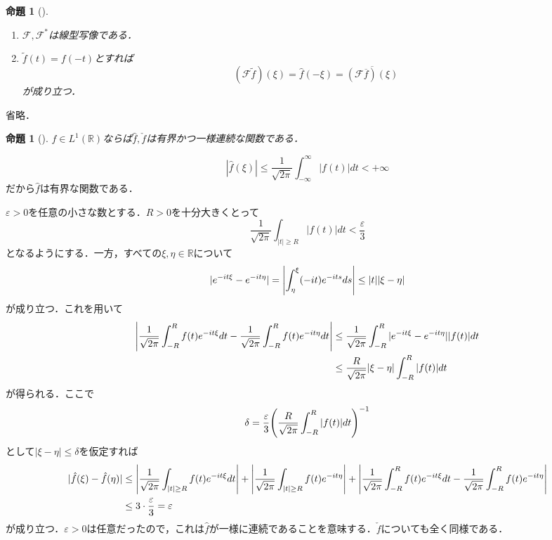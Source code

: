 \documentclass[dvipdfmx,a4j,10pt]{jsarticle}
\makeatletter
\theoremstyle{mystyle1}
\newtheorem{proposition}[theorem]{命題}
\theoremstyle{mystyle3}
\theoremstyle{mystyle4}
\theoremstyle{mystyle6}
\theoremstyle{mystyle2}
\theoremstyle{mystyle5}
\renewenvironment{proof}[1][\proofname]{\par
  \pushQED{\qed}%
  \normalfont
  \topsep6\p@\@plus6\p@ \trivlist
  \item[\hskip\labelsep{\bfseries\sffamily #1}]\ignorespaces
}{%
  \popQED\endtrivlist\@endpefalse
}
\renewcommand\proofname{証明}
\newenvironment{prop}[1][]
{\begin{tcolorbox}[
    enhanced,
    boxrule=0pt,
    arc=0mm,
    frame hidden,
    borderline west={2pt}{-4pt}{blue!50!black},
    breakable = true
    ]
    \begin{proposition}[#1]
}
{\end{proposition}\end{tcolorbox}}
\makeatother
\begin{document}
\begin{prop}\label{prop:3-1}
	\begin{enumerate}
		\item $\mathcal{F},\mathcal{F}^*$は線型写像である．
		\item $\tilde f(t)=f(-t)$とすれば
		      \[
			      (\mathcal{F}\tilde f)(\xi)=\hat f(-\xi)=\overline{(\mathcal{F}\overline{f})(\xi)}
		      \]
		      が成り立つ．
	\end{enumerate}
\end{prop}

\begin{proof}
	省略．
\end{proof}

\begin{prop}\label{prop:3-2}
	$f\in L^1(\mathbb{R})$ならば$\hat f,\check f$は有界かつ一様連続な関数である．
\end{prop}

\begin{proof}
	\[
		|\hat f(\xi)|\leq\frac{1}{\sqrt{2\pi}}\int_{-\infty}^\infty |f(t)|dt<+\infty
	\]
	だから$\hat f$は有界な関数である．

	$\varepsilon>0$を任意の小さな数とする．$R>0$を十分大きくとって
	\[
		\frac{1}{\sqrt{2\pi}}\int_{|t|\geq R}|f(t)|dt<\frac{\varepsilon}{3}
	\]
	となるようにする．一方，すべての$\xi,\eta\in\mathbb{R}$について
	\[
		|e^{-it\xi}-e^{-it\eta}|=\mleft|\int_\eta^\xi(-it)e^{-its}ds\mright|\leq |t||\xi-\eta|
	\]
	が成り立つ．これを用いて
	\[
		\begin{split}
			\mleft|\frac{1}{\sqrt{2\pi}}\int_{-R}^Rf(t)e^{-it\xi}dt-\frac{1}{\sqrt{2\pi}}\int_{-R}^Rf(t)e^{-it\eta}dt\mright|
			&\leq \frac{1}{\sqrt{2\pi}}\int_{-R}^R|e^{-it\xi}-e^{-it\eta}||f(t)|dt \\
			&\leq \frac{R}{\sqrt{2\pi}}|\xi-\eta|\int_{-R}^R|f(t)|dt
		\end{split}
	\]
	が得られる．ここで
	\[
		\delta=\frac{\varepsilon}{3}\mleft(\frac{R}{\sqrt{2\pi}}\int_{-R}^R|f(t)|dt\mright)^{-1}
	\]
	として$|\xi-\eta|\leq\delta$を仮定すれば
	\[
		\begin{split}
			|\hat f(\xi)-\hat f(\eta)|
			&\leq\mleft|\frac{1}{\sqrt{2\pi}}\int_{|t|\geq R}f(t)e^{-it\xi}dt\mright|+\mleft|\frac{1}{\sqrt{2\pi}}\int_{|t|\geq R}f(t)e^{-it\eta}\mright|+\mleft|\frac{1}{\sqrt{2\pi}}\int_{-R}^Rf(t)e^{-it\xi}dt-\frac{1}{\sqrt{2\pi}}\int_{-R}^Rf(t)e^{-it\eta}\mright| \\
			&\leq 3\cdot\frac{\varepsilon}{3}=\varepsilon
		\end{split}
	\]
	が成り立つ．$\varepsilon>0$は任意だったので，これは$\hat f$が一様に連続であることを意味する．$\check f$についても全く同様である．
\end{proof}
\end{document}
